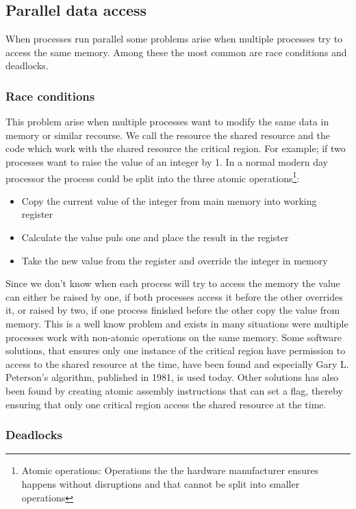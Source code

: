 \subsection{Parallel data access}
When processes run parallel some problems arise when multiple processes try to access the same memory. Among these the most common are race conditions and deadlocks.

\subsubsection{Race conditions}
This problem arise when multiple processes want to modify the same data in memory or similar recourse. We call the resource the shared resource and the code which work with the shared resource the critical region. For example; if two processes want to raise the value of an integer by 1. In a normal modern day processor the process could be split into the three atomic operations\footnote{Atomic operations: Operations the the hardware manufacturer ensures happens without disruptions and that cannot be split into smaller operations}:
\begin{itemize}
\item Copy the current value of the integer from main memory into working register
\item Calculate the value puls one and place the result in the register
\item Take the new value from the register and override the integer in memory
\end{itemize}
Since we don't know when each process will try to access the memory the value can either be raised by one, if both processes access it before the other overrides it, or raised by two, if one process finished before the other copy the value from memory. This is a well know problem and exists in many situations were multiple processes work with non-atomic operations on the same memory. Some software solutions, that ensures only one instance of the critical region have permission to access to the shared resource at the time, have been found and especially Gary L. Peterson's algorithm, published in 1981, is used today. Other solutions has also been found by creating atomic assembly instructions that can set a flag, thereby ensuring that only one critical region access the shared resource at the time.

\subsubsection{Deadlocks}

